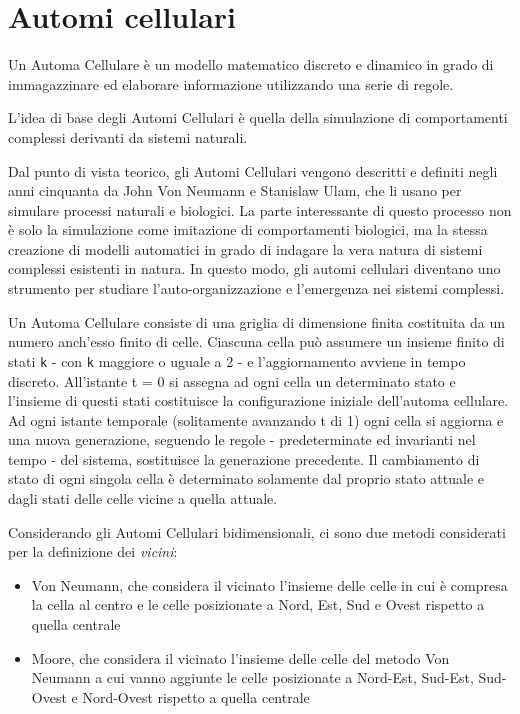 \section{Automi cellulari}
\label{automi_cellulari}

Un Automa Cellulare è un modello matematico discreto e dinamico in grado di immagazzinare ed elaborare informazione utilizzando una serie di regole.
\par
L’idea di base degli Automi Cellulari è quella della simulazione di comportamenti complessi derivanti da sistemi naturali.
\par
Dal punto di vista teorico, gli Automi Cellulari vengono descritti e definiti negli anni cinquanta da John Von Neumann e Stanislaw Ulam, che li usano per simulare processi naturali e biologici. La parte interessante di questo processo non è solo la simulazione come imitazione di comportamenti biologici, ma la stessa creazione di modelli automatici in grado di indagare la vera natura di sistemi complessi esistenti in natura. In questo modo, gli automi cellulari diventano uno strumento per studiare l’auto-organizzazione e l’emergenza nei sistemi complessi.
\par
Un Automa Cellulare consiste di una griglia di dimensione finita costituita da un numero anch’esso finito di celle. Ciascuna cella può assumere un insieme finito di stati \texttt{k} - con \texttt{k} maggiore o uguale a 2 - e l'aggiornamento avviene in tempo discreto. All’istante t = 0 si assegna ad ogni cella un determinato stato e l’insieme di questi stati costituisce la configurazione iniziale dell'automa cellulare. Ad ogni istante temporale (solitamente avanzando t di 1) ogni cella si aggiorna e una nuova generazione, seguendo le regole - predeterminate ed invarianti nel tempo - del sistema, sostituisce la generazione precedente. Il cambiamento di stato di ogni singola cella è determinato solamente dal proprio stato attuale e dagli stati delle celle vicine a quella attuale. 
\par
Considerando gli Automi Cellulari bidimensionali, ci sono due metodi considerati per la definizione dei \textit{vicini}:
\begin{itemize}
\item Von Neumann, che considera il vicinato l'insieme delle celle in cui è compresa la cella al centro e le celle posizionate a Nord, Est, Sud e Ovest rispetto a quella centrale
\item Moore, che considera il vicinato l'insieme delle celle del metodo Von Neumann a cui vanno aggiunte le celle posizionate a Nord-Est, Sud-Est, Sud-Ovest e Nord-Ovest rispetto a quella centrale
\end{itemize}
